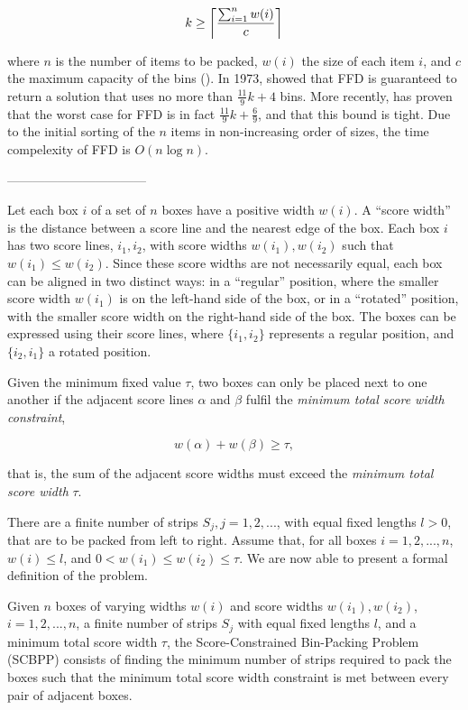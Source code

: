 \documentclass[oribibl]{llncs}
\begin{document}
\begin{equation*}
	k \geq \ceil*{\frac{\sum_{i=1}^{n}w(i)}{c}}
\end{equation*}

where $n$ is the number of items to be packed, $w(i)$ the size of each item $i$, and $c$ the maximum capacity of the bins (\citealp{martello1990b}). In 1973, \citeauthor{johnson1973} showed that FFD is guaranteed to return a solution that uses no more than $\frac{11}{9}k + 4$ bins. More recently, \cite{dosa2007} has proven that the worst case for FFD is in fact $\frac{11}{9}k + \frac{6}{9}$, and that this bound is tight. Due to the initial sorting of the $n$ items in non-increasing order of sizes, the time compelexity of FFD is $O(n\log n)$.

---------------------------------

Let each box $i$ of a set of $n$ boxes have a positive width $w(i)$. A ``score width'' is the distance between a score line and the nearest edge of the box. Each box $i$ has two score lines, $i_1, i_2$, with score widths $w(i_1), w(i_2)$ such that $w(i_1) \leq w(i_2)$. Since these score widths are not necessarily equal, each box can be aligned in two distinct ways: in a ``regular'' position, where the smaller score width $w(i_1)$ is on the left-hand side of the box, or in a ``rotated'' position, with the smaller score width on the right-hand side of the box. The boxes can be expressed using their score lines, where $\{i_1, i_2\}$ represents a regular position, and $\{i_2, i_1\}$ a rotated position. 

Given the minimum fixed value $\tau$, two boxes can only be placed next to one another if the adjacent score lines $\alpha$ and $\beta$ fulfil the \textit{minimum total score width constraint},

\begin{equation*}
	w(\alpha) + w(\beta) \geq \tau,
\end{equation*}

that is, the sum of the adjacent score widths must exceed the \textit{minimum total score width} $\tau$.

There are a finite number of strips $S_j, j = 1, 2, ...$, with equal fixed lengths $l > 0$, that are to be packed from left to right. Assume that, for all boxes $i = 1, 2, ..., n$, $w(i) \leq l$, and $0 < w(i_1) \leq w(i_2) \leq \tau$. We are now able to present a formal definition of the problem.

\begin{definition}
	Given $n$ boxes of varying widths $w(i)$ and score widths $w(i_1), w(i_2)$, $i = 1, 2, ..., n$, a finite number of strips $S_j$ with equal fixed lengths $l$, and a minimum total score width $\tau$, the Score-Constrained Bin-Packing Problem (SCBPP) consists of finding the minimum number of strips required to pack the boxes such that the minimum total score width constraint is met between every pair of adjacent boxes. 
\end{definition}
\end{document}
